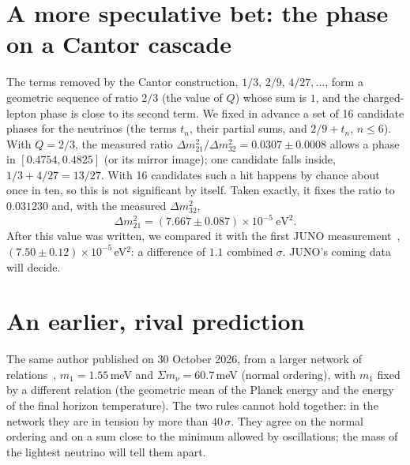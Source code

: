 \documentclass[11pt,a4paper]{article}
\begin{document}
\section{A more speculative bet: the phase on a Cantor cascade}
The terms removed by the Cantor construction, $1/3,\,2/9,\,4/27,\dots$, form a geometric sequence of ratio $2/3$ (the
value of $Q$) whose sum is $1$, and the charged-lepton phase is close to its second term. We fixed in advance a set of
16 candidate phases for the neutrinos (the terms $t_n$, their partial sums, and $2/9+t_n$, $n\le6$). With $Q=2/3$, the
measured ratio $\Delta m^2_{21}/\Delta m^2_{32}=0.0307\pm0.0008$ allows a phase in $[0.4754,0.4825]$ (or its mirror
image); one candidate falls inside, $1/3+4/27=13/27$. With 16 candidates such a hit happens by chance about once in
ten, so this is not significant by itself. Taken exactly, it fixes the ratio to $0.031230$ and, with the measured
$\Delta m^2_{32}$,
\begin{equation}
  \Delta m^2_{21}=(7.667\pm0.087)\times10^{-5}\ \text{eV}^2 .
\end{equation}
After this value was written, we compared it with the first JUNO measurement~\cite{juno},
$(7.50\pm0.12)\times10^{-5}$\,eV$^2$: a difference of $1.1$ combined $\sigma$. JUNO's coming data will decide.

\section{An earlier, rival prediction}
The same author published on 30 October 2026, from a larger network of relations~\cite{grmsite}, $m_1=1.55$\,meV and
$\Sigma m_\nu=60.7$\,meV (normal ordering), with $m_1$ fixed by a different relation (the geometric mean of the Planck
energy and the energy of the final horizon temperature). The two rules cannot hold together: in the network they are in
tension by more than $40\,\sigma$. They agree on the normal ordering and on a sum close to the minimum allowed by
oscillations; the mass of the lightest neutrino will tell them apart.
\end{document}
